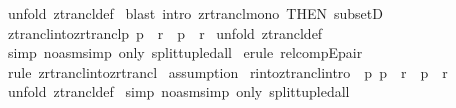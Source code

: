 \begin{isabellebody}
%
\isadelimproof
%
\endisadelimproof
%
\isatagproof
{}\isamarkupfalse%
\ {\isacharparenleft}unfold\ ztrancl{\isacharunderscore}def{\isacharparenright}\isanewline
{}\isamarkupfalse%
\ {\isacharparenleft}blast\ intro{\isacharcolon}\ zrtrancl{\isacharunderscore}mono\ {\isacharbrackleft}THEN\ subsetD{\isacharbrackright}{\isacharparenright}\isanewline
{}\isamarkupfalse%
%
\endisatagproof
{\isafoldproof}%
%
\isadelimproof
\isanewline
%
\endisadelimproof
\isanewline
\isanewline
\isanewline
{}\isamarkupfalse%
\ ztrancl{\isacharunderscore}into{\isacharunderscore}zrtrancl{\isacharcolon}{\isachardoublequoteopen}{\isacharbang}{\isacharbang}p{\isachardot}\ p\ {\isacharcolon}\ r{\isacharpercent}{\isacharplus}\ {\isacharequal}{\isacharequal}{\isachargreater}\ p\ {\isacharcolon}\ r{\isacharpercent}{\isacharasterisk}{\isachardoublequoteclose}\isanewline
%
\isadelimproof
%
\endisadelimproof
%
\isatagproof
{}\isamarkupfalse%
\ {\isacharparenleft}unfold\ ztrancl{\isacharunderscore}def{\isacharparenright}\isanewline
{}\isamarkupfalse%
\ {\isacharparenleft}simp\ {\isacharparenleft}no{\isacharunderscore}asm{\isacharunderscore}simp{\isacharparenright}\ only{\isacharcolon}\ split{\isacharunderscore}tupled{\isacharunderscore}all{\isacharparenright}\isanewline
{}\isamarkupfalse%
\ {\isacharparenleft}erule\ rel{\isacharunderscore}compEpair{\isacharparenright}\isanewline
{}\isamarkupfalse%
\ {\isacharparenleft}rule\ zrtrancl{\isacharunderscore}into{\isacharunderscore}zrtrancl{\isacharparenright}\isanewline
{}\isamarkupfalse%
\ {\isacharparenleft}assumption{\isacharplus}{\isacharparenright}\isanewline
{}\isamarkupfalse%
%
\endisatagproof
{\isafoldproof}%
%
\isadelimproof
\isanewline
%
\endisadelimproof
\isanewline
\isanewline
{}\isamarkupfalse%
\ r{\isacharunderscore}into{\isacharunderscore}ztrancl{\isacharbrackleft}intro{\isacharbrackright}{\isacharcolon}\ \ {\isachardoublequoteopen}{\isacharbang}{\isacharbang}p{\isachardot}\ p\ {\isacharcolon}\ r\ {\isacharequal}{\isacharequal}{\isachargreater}\ p\ {\isacharcolon}\ r{\isacharpercent}{\isacharplus}{\isachardoublequoteclose}\isanewline
%
\isadelimproof
%
\endisadelimproof
%
\isatagproof
{}\isamarkupfalse%
\ {\isacharparenleft}unfold\ ztrancl{\isacharunderscore}def{\isacharparenright}\isanewline
{}\isamarkupfalse%
\ {\isacharparenleft}simp\ {\isacharparenleft}no{\isacharunderscore}asm{\isacharunderscore}simp{\isacharparenright}\ only{\isacharcolon}\ split{\isacharunderscore}tupled{\isacharunderscore}all{\isacharparenright}\isanewline

\end{isabellebody}
